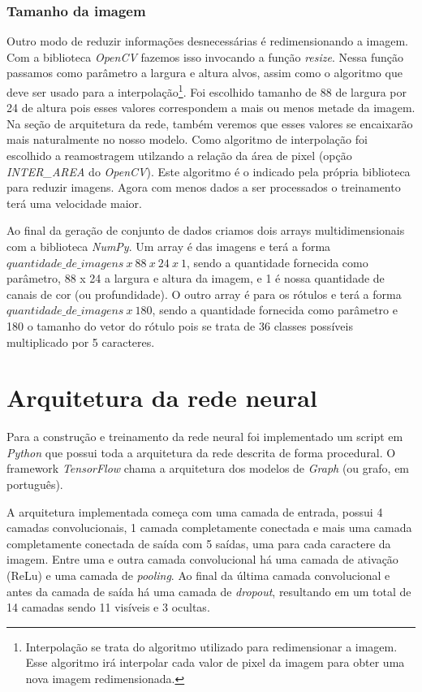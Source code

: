 \subsubsection{Tamanho da imagem}

Outro modo de reduzir informações desnecessárias é redimensionando a
imagem. Com a biblioteca \textit{OpenCV} fazemos isso invocando a
função \textit{resize}. Nessa função passamos como parâmetro a largura
e altura alvos, assim como o algoritmo que deve ser usado para a
interpolação\footnote{Interpolação se trata do algoritmo utilizado
  para redimensionar a imagem. Esse algoritmo irá interpolar cada
  valor de pixel da imagem para obter uma nova imagem
  redimensionada.}. Foi escolhido tamanho de 88 de largura por 24 de
altura pois esses valores correspondem a mais ou menos metade da
imagem. Na seção de arquitetura da rede, também veremos que esses
valores se encaixarão mais naturalmente no nosso modelo. Como
algoritmo de interpolação foi escolhido a reamostragem utilzando a
relação da área de pixel (opção \textit{INTER\_AREA} do
\textit{OpenCV}). Este algoritmo é o indicado pela própria biblioteca
para reduzir imagens. Agora com menos dados a ser processados o
treinamento terá uma velocidade maior.

Ao final da geração de conjunto de dados criamos dois arrays
multidimensionais com a biblioteca \textit{NumPy}. Um array é das
imagens e terá a forma $quantidade\_de\_imagens\ x\ 88\ x\ 24\ x\ 1$,
sendo a quantidade fornecida como parâmetro, 88 x 24 a largura e
altura da imagem, e 1 é nossa quantidade de canais de cor (ou
profundidade). O outro array é para os rótulos e terá a forma
$quantidade\_de\_imagens\ x\ 180$, sendo a quantidade fornecida como
parâmetro e 180 o tamanho do vetor do rótulo pois se trata de 36
classes possíveis multiplicado por 5 caracteres.

\section{Arquitetura da rede neural}

Para a construção e treinamento da rede neural foi implementado um
script em \textit{Python} que possui toda a arquitetura da rede
descrita de forma procedural. O framework \textit{TensorFlow} chama a
arquitetura dos modelos de \textit{Graph} (ou grafo, em português).

A arquitetura implementada começa com uma camada de entrada, possui 4
camadas convolucionais, 1 camada completamente conectada e mais uma
camada completamente conectada de saída com 5 saídas, uma para cada
caractere da imagem. Entre uma e outra camada convolucional há uma
camada de ativação (ReLu) e uma camada de \textit{pooling}. Ao final
da última camada convolucional e antes da camada de saída há uma
camada de \textit{dropout}, resultando em um total de 14 camadas sendo
11 visíveis e 3 ocultas.

